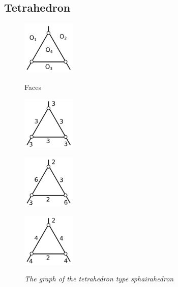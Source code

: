 \documentclass[dvipdfmx]{interact}
\theoremstyle{plain}%
\theoremstyle{definition}
\theoremstyle{remark}
\theoremstyle{problemstyle}
\begin{document}
\subsection{Tetrahedron}
\begin{figure}[h!tbp]
  \begin{minipage}[t]{0.23\textwidth}
   \centering
   \includegraphics[width=1in, keepaspectratio]{./img/HexahedraWithSphericalFaces/tetrahedron/tetrahedronFaces.png}
   \caption{Faces}
   \label{fig:}
  \end{minipage}
 \hspace*{\fill}
  \begin{minipage}[t]{0.69\textwidth}
  \begin{minipage}[t]{0.23\textwidth}
   \centering
   \includegraphics[width=1in,
   keepaspectratio]{./img/HexahedraWithSphericalFaces/tetrahedron/tetrahedron_a.png}
   \subcaption{}
   \label{fig:}
  \end{minipage}
  \hspace*{\fill}
  \begin{minipage}[t]{0.23\textwidth}
   \centering
   \includegraphics[width=1in, keepaspectratio]{./img/HexahedraWithSphericalFaces/tetrahedron/tetrahedron_b.png}
   \subcaption{}
   \label{}
  \end{minipage}
 \hspace*{\fill}
  \begin{minipage}[t]{0.23\textwidth}
   \centering
   \includegraphics[width=1in, keepaspectratio]{./img/HexahedraWithSphericalFaces/tetrahedron/tetrahedron_c.png}
   \subcaption{}
   \label{fig:}
  \end{minipage}
 \hspace*{\fill}
 \caption{\textit{The graph of the tetrahedron type sphairahedron}}
 \label{fig:tetrahedronFaces}
  \end{minipage}
\end{figure}
\end{document}
